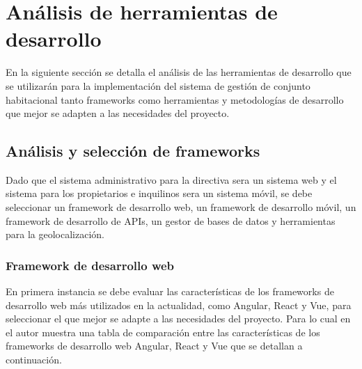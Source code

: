 \section{Análisis de herramientas de desarrollo}\label{sec:analisis-frameworks-desarrollo}

En la siguiente sección se detalla el análisis de las herramientas de desarrollo que se utilizarán para la implementación del sistema de gestión de conjunto habitacional tanto frameworks como herramientas y metodologías de desarrollo que mejor se adapten a las necesidades del proyecto.

\subsection{Análisis y selección de frameworks}\label{subsec:analisis-seleccion-frameworks-desarrollo}

Dado que el sistema administrativo para la directiva sera un sistema web y el sistema para los propietarios e inquilinos sera un sistema móvil, se debe seleccionar un framework de desarrollo web, un framework de desarrollo móvil, un framework de desarrollo de APIs, un gestor de bases de datos y herramientas para la geolocalización.

\subsubsection{Framework de desarrollo web}\label{subsubsec:framework-desarrollo-web}

En primera instancia se debe evaluar las características de los frameworks de desarrollo web más utilizados en la actualidad, como Angular, React y Vue, para seleccionar el que mejor se adapte a las necesidades del proyecto.
Para lo cual en \cite{universitat_politecnica_de_valencia_universitat_2014}  el autor muestra una tabla de comparación entre las características de los frameworks de desarrollo web Angular, React y Vue que se detallan a continuación.

